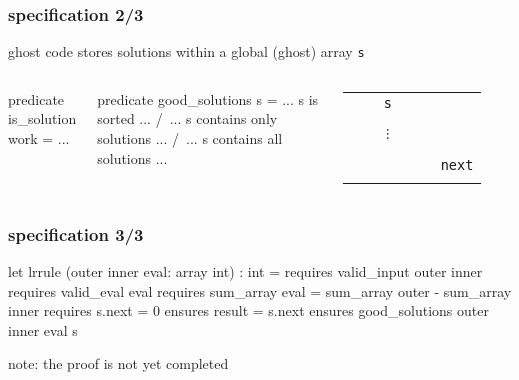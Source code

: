 \documentclass{beamer}
\let\emph\alert
\begin{document}
\begin{frame}[fragile]\frametitle{specification 2/3}
  ghost code stores solutions within a global (ghost) array \texttt{s}

  \bigskip
  \begin{columns}
\begin{why3}
predicate is_solution work =
  ...
\end{why3}
\begin{why3}
predicate good_solutions s =
  ... s is sorted ... /\
  ... s contains only solutions ... /\
  ... s contains all solutions ...
\end{why3}

  \begin{tabular}{|c|l}
  \multicolumn{1}{c}{\texttt{~~~~s~~~~}} \\\cline{1-1}
  \\\cline{1-1}
  \\\cline{1-1}
  $\vdots$ \\\cline{1-1}
  \\\cline{1-1}
  \\\cline{1-1} & \texttt{next}
  \\
  \\
  \end{tabular}
  \end{columns}
\end{frame}

\begin{frame}[fragile]\frametitle{specification 3/3}
\begin{why3}
let lrrule (outer inner eval: array int) : int =
  requires { valid_input outer inner }
  requires { valid_eval eval }
  requires { sum_array eval =
               sum_array outer - sum_array inner }
  requires { s.next = 0 }
  ensures  { result = s.next }
  ensures  { good_solutions outer inner eval s }
\end{why3}
  \bigskip
  note: the proof is \emph{not yet completed}
\end{frame}

\end{document}

